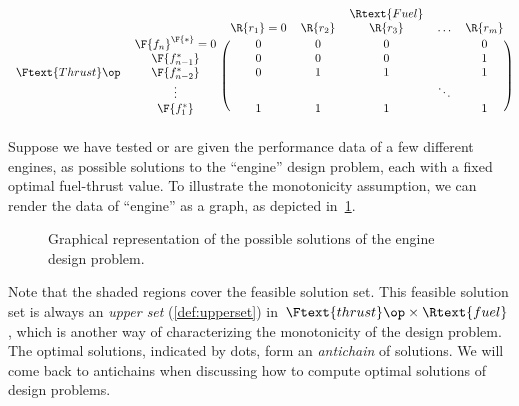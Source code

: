 \begin{example}
    \begin{equation}
        \begin{blockarray}{ccccccc}
            &&&& \Rtext{Fuel} \\
            && \R{r_1} = 0  & \R{r_2} & \R{r_3} & \hdots & \R{r_m} \\
            \begin{block}{cc(ccccc)}
                & \F{f_n}^\F{*} = 0 & 0 & 0 & 0 & & 0 \\
                & \F{f_{n-1}^*} & 0 & 0 & 0 & & 1 \\
                \Ftext{Thrust}\op & \F{f_{n-2}^*} & 0 & 1 & 1 & & 1 \\
                & \vdots &  &  &  & \ddots & \\
                & \F{f_1^*} & 1 & 1 & 1 & & 1 \\
            \end{block}
        \end{blockarray}
    \end{equation}
    Suppose we have tested or are given the performance data of a few different engines, as possible solutions to the ``engine'' design problem, each with a fixed optimal fuel-thrust value.
    To illustrate the monotonicity assumption, we can render the data of ``engine'' as a graph, as depicted in~\cref{fig:solenginedp}.
    \begin{figure}[h!]
        \centering
        \caption{Graphical representation of the possible solutions of the engine design problem. }
        \label{fig:solenginedp}
    \end{figure}
    
    Note that the shaded regions cover the feasible solution set.
    This feasible solution set is always an \emph{upper set} (\cref{def:upperset}) in~$\Ftext{thrust}\op \times \Rtext{fuel}$, which is another way of characterizing the monotonicity of the design problem.
    The optimal solutions, indicated by dots, form an \emph{antichain} of solutions.
    We will come back to antichains when discussing how to compute optimal solutions of design problems.
\end{example}


